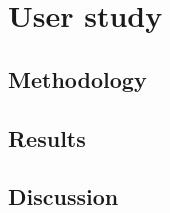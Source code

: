 \chapter{User study}  \label{chap:user_study}

\section{Methodology}

\section{Results}

\section{Discussion}